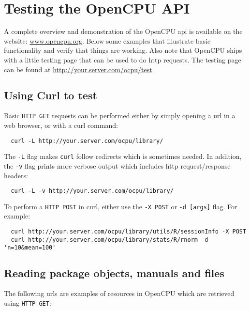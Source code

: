 \documentclass{scrartcl}\usepackage[]{graphicx}\usepackage[]{color}
\begin{document}
\section{Testing the OpenCPU API}

A complete overview and demonstration of the OpenCPU api is available on the website: \href{http://www.opencpu.org}{www.opencpu.org}. Below some examples that illustrate basic functionality and verify that things are working. Also note that OpenCPU ships with a little testing page that can be used to do http requests. The testing page can be found at \url{http://your.server.com/ocpu/test}. 

\subsection{Using Curl to test}


\noindent Basic \texttt{HTTP GET} requests can be performed either by simply opening a url in a web browser, or with a curl command:

\begin{verbatim}
  curl -L http://your.server.com/ocpu/library/
\end{verbatim}
The \texttt{-L} flag makes \texttt{curl} follow redirects which is sometimes needed. In addition, the \texttt{-v} flag prints more verbose output which includes http request/response headers:
\begin{verbatim}
  curl -L -v http://your.server.com/ocpu/library/
\end{verbatim}

\noindent To perform a \texttt{HTTP POST} in curl, either use the \texttt{-X POST} or \texttt{-d [args]} flag. For example:

\begin{verbatim}
  curl http://your.server.com/ocpu/library/utils/R/sessionInfo -X POST
  curl http://your.server.com/ocpu/library/stats/R/rnorm -d 'n=10&mean=100'
\end{verbatim}


\subsection{Reading package objects, manuals and files}

\noindent The following urls are examples of resources in OpenCPU which are retrieved using \texttt{HTTP GET}:\\
\end{document}
